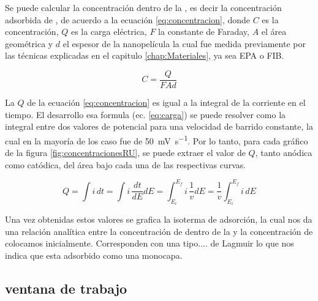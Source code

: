 	Se puede calcular la concentración dentro de la \pdm, es decir la concentración adsorbida de \aminorutenio\space, de acuerdo a la ecuación \ref{eq:concentracion}, donde $C$ es la concentración, $Q$ es la carga eléctrica, $F$ la constante de Faraday, $A$ el área geométrica y $d$ el espesor de la nanopelícula la cual fue medida previamente por las técnicas explicadas en el capitulo \ref{chap:Materiales}, ya sea EPA o FIB.

	\begin{equation}
			C=\frac{Q}{FAd}
			\label{eq:concentracion}
	\end{equation}

	La $Q$ de la ecuación \ref{eq:concentracion} es igual a la integral de la corriente en el tiempo. El desarrollo esa formula (ec. \ref{eq:carga}) se puede resolver como la integral entre dos valores de potencial para una velocidad de barrido constante, la cual en la mayoría de los caso fue de \SI{50}{\milli\volt\per\second}. Por lo tanto, para cada gráfico de la figura \ref{fig:concentracionesRU}, se puede extraer el valor de $Q$, tanto anódica como catódica, del área bajo cada una de las respectivas curvas. 


	\begin{equation}
			Q=\int i\,dt = \int i\, \frac{dt}{dE} dE = \int_{E_{i}}^{E_{f}} i\,\frac{1}{v}dE=\frac{1}{v}\int_{E_{i}}^{E_{f}} i\,dE
			\label{eq:carga}
	\end{equation}

	Una vez obtenidas estos valores se grafica la isoterma de adsorción, la cual nos da una relación analítica entre la concentración de \aminorutenio\space dentro de la \pdm\space y la concentración de \aminorutenio\space colocamos inicialmente. Corresponden con una tipo.... de Lagmuir lo que nos indica que esta adsorbido como una monocapa.


	
	
	\subsection{ventana de trabajo}	


